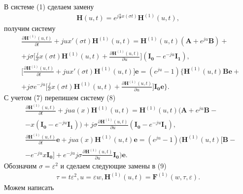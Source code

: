 В системе (1) сделаем замену 
\begin{align*}
	\boldsymbol{H}(u,t)=e^{j\frac{u}{\sigma}x(\sigma t)}\boldsymbol{H}^{(1)}(u,t),
\end{align*}
получим систему
\begin{equation}
	\begin{split}
		&\frac{\partial\boldsymbol{H}^{(1)}(u,t)}{\partial t}+jux'(\sigma t)\boldsymbol{H}^{(1)}(u,t)=\boldsymbol{H}^{(1)}(u,t)(\boldsymbol{A}+e^{ju}\boldsymbol{B})+\\
		&+j\sigma \bigg[ \frac{j}{\sigma}x(\sigma t)\boldsymbol{H}^{(1)}(u,t)+\frac{\partial\boldsymbol{H}^{(1)}(u,t)}{\partial u} \bigg](\boldsymbol{I_{0}}-e^{-ju}\boldsymbol{I_{1}}),\\
		&\bigg[\frac{\partial\boldsymbol{H}^{(1)}(u,t)}{\partial t}+jux'(\sigma t)\boldsymbol{H}^{(1)}(u,t)\bigg]\boldsymbol{e}=(e^{ju}-1)\bigg\{\boldsymbol{H}^{(1)}(u,t)\boldsymbol{Be}+\\
		&+j\sigma e^{-ju}\bigg[\frac{j}{\sigma} x(\sigma t)\boldsymbol{H}^{(1)}(u,t)+\frac{\partial\boldsymbol{H}^{(1)}(u,t)}{\partial u}\bigg]\boldsymbol{I_{0}e}\bigg\}.
	\end{split}
\end{equation}
С учетом (7) перепишем систему (8)
\begin{equation}
	\begin{split}
		&\frac{\partial\boldsymbol{H}^{(1)}(u,t)}{\partial t}+jua(x)\boldsymbol{H}^{(1)}(u,t)=\boldsymbol{H}^{(1)}(u,t)(\boldsymbol{A}+e^{ju}\boldsymbol{B}-\\
		&-x(\boldsymbol{I_{0}}-e^{-ju}\boldsymbol{I_{1}}))+j\sigma \frac{\partial\boldsymbol{H}^{(1)}(u,t)}{\partial u}(\boldsymbol{I_{0}}-e^{-ju}\boldsymbol{I_{1}}),\\
		&\frac{\partial \boldsymbol{H}^{(1)}(u,t)}{\partial t}\boldsymbol{e}+jua(x)\boldsymbol{H}^{(1)}(u,t)\boldsymbol{e}=(e^{ju}-1)(\boldsymbol{H}^{(1)}(u,t)[\boldsymbol{B}-\\
		&-e^{-ju}x\boldsymbol{I_{0}}]+e^{-ju}j\sigma \frac{\partial\boldsymbol{H}^{(1)}(u,t)}{\partial u}\boldsymbol{I_{0}})\boldsymbol{e}.
	\end{split}
\end{equation}
Обозначим $\sigma = \varepsilon^{2}$ и сделаем следующие замены в (9)
\begin{align}
	\tau=t\varepsilon^{2},u=\varepsilon w, \boldsymbol{H}^{(1)}(u,t)=\boldsymbol{F}^{(1)}(w,\tau,\varepsilon).
\end{align}
Можем написать 
